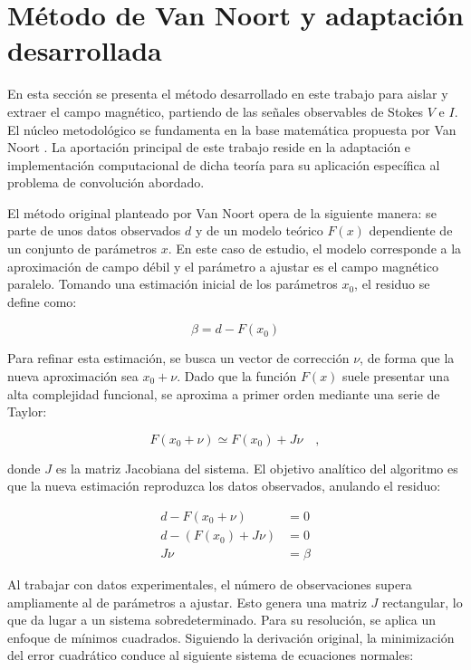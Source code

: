 \section{Método de Van Noort y adaptación desarrollada} \label{sec:metodoDes}

En esta sección se presenta el método desarrollado en este trabajo para aislar y extraer el campo magnético, partiendo de las señales observables de Stokes $V$ e $I$. El núcleo metodológico se fundamenta en la base matemática propuesta por Van Noort \cite{vannoortSpatiallyCoupledInversion2012}. La aportación principal de este trabajo reside en la adaptación e implementación computacional de dicha teoría para su aplicación específica al problema de convolución abordado.

El método original planteado por Van Noort opera de la siguiente manera: se parte de unos datos observados $d$ y de un modelo teórico $F(x)$ dependiente de un conjunto de parámetros $x$. En este caso de estudio, el modelo corresponde a la aproximación de campo débil \cite{cteGeff, Unno1956}
y el parámetro a ajustar es el campo magnético paralelo. Tomando una estimación inicial de los parámetros $x_0$, el residuo se define como:

\begin{equation}
    \beta = d - F(x_0)
\end{equation}

Para refinar esta estimación, se busca un vector de corrección $\nu$, de forma que la nueva aproximación sea $x_0 + \nu$. Dado que la función $F(x)$ suele presentar una alta complejidad funcional, se aproxima a primer orden mediante una serie de Taylor:

\begin{equation}
    F(x_0 + \nu) \simeq F(x_0) + J \nu \quad,
\end{equation}

donde $J$ es la matriz Jacobiana del sistema. El objetivo analítico del algoritmo es que la nueva estimación reproduzca los datos observados, anulando el residuo:

\begin{equation}
    \begin{split}
        d - F(x_0 + \nu) &= 0 \\
        d - (F(x_0) + J \nu) &= 0 \\
        J \nu &= \beta
    \end{split}
\end{equation}

Al trabajar con datos experimentales, el número de observaciones supera ampliamente al de parámetros a ajustar. Esto genera una matriz $J$ rectangular, lo que da lugar a un sistema sobredeterminado. Para su resolución, se aplica un enfoque de mínimos cuadrados. Siguiendo la derivación original, la minimización del error cuadrático conduce al siguiente sistema de ecuaciones normales:

